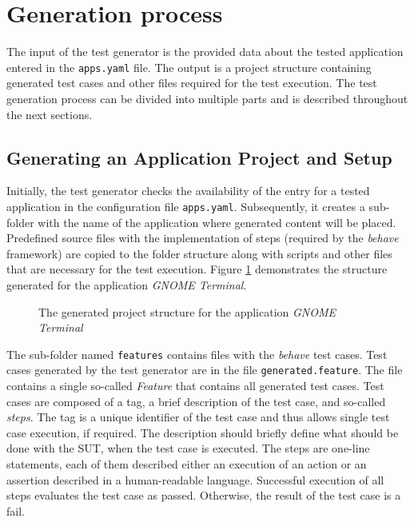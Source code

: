 \section{Generation process}
The input of the test generator is the provided data about the tested application entered in the \texttt{apps.yaml} file. The output is a project structure containing generated test cases and other files required for the test execution. The test generation process can be divided into multiple parts and is described throughout the next sections.

\subsection{Generating an Application Project and Setup}
Initially, the test generator checks the availability of the entry for a tested application in the configuration file \texttt{apps.yaml}. Subsequently, it creates a sub-folder with the name of the application where generated content will be placed. Predefined source files with the implementation of steps (required by the \textit{behave} framework) are copied to the folder structure along with scripts and other files that are necessary for the test execution. Figure \ref{project_folder} demonstrates the structure generated for the application \textit{GNOME Terminal}.

\begin{figure}[H]
\caption{The generated project structure for the application \textit{GNOME Terminal}}
\label{project_folder}
\end{figure}

The sub-folder named \texttt{features} contains files with the \textit{behave} test cases. Test cases generated by the test generator are in the file \texttt{generated.feature}. The file contains a single so-called \textit{Feature} that contains all generated test cases. Test cases are composed of a tag, a brief description of the test case, and so-called \textit{steps}. The tag is a unique identifier of the test case and thus allows single test case execution, if required. The description should briefly define what should be done with the SUT, when the test case is executed. The steps are one-line statements, each of them described either an execution of an action or an assertion described in a human-readable language. Successful execution of all steps evaluates the test case as passed. Otherwise, the result of the test case is a fail.

